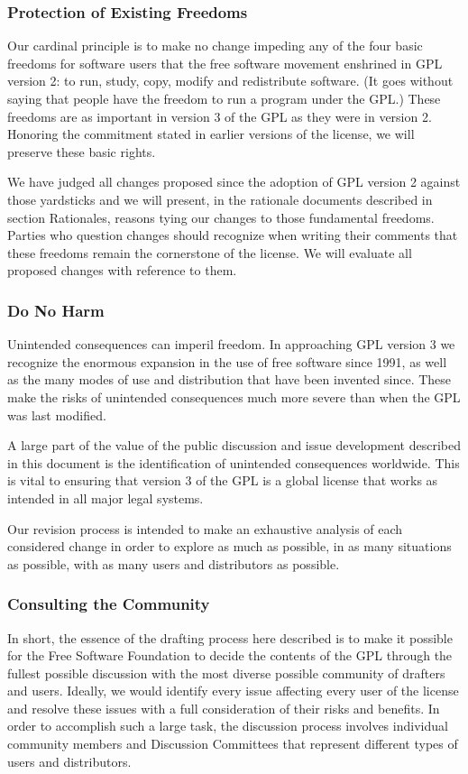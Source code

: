 \documentclass[a4paper,spanish,12pt]{book}
\begin{document}
\subsubsection{Protection of Existing Freedoms} Our cardinal principle is to
make no change impeding any of the four basic freedoms for software
users that the free software movement enshrined in GPL version 2: to
run, study, copy, modify and redistribute software.  (It goes without
saying that people have the freedom to run a program under the GPL\@.)
These freedoms are as important in version 3 of the GPL as they were
in version 2.  Honoring the commitment stated in earlier versions of
the license, we will preserve these basic rights.

We have judged all changes proposed since the adoption of GPL version
2 against those yardsticks and we will present, in the rationale
documents described in section Rationales, reasons tying our
changes to those fundamental freedoms.  Parties who question changes
should recognize when writing their comments that these freedoms
remain the cornerstone of the license.  We will evaluate all proposed
changes with reference to them.

\subsubsection{Do No Harm} Unintended consequences can imperil freedom.  In
approaching GPL version 3 we recognize the enormous expansion in the
use of free software since 1991, as well as the many modes of use and
distribution that have been invented since.  These make the risks of
unintended consequences much more severe than when the GPL was last
modified.

A large part of the value of the public discussion and issue
development described in this document is the identification of
unintended consequences worldwide.  This is vital to ensuring that
version 3 of the GPL is a global license that works as intended in all
major legal systems.

Our revision process is intended to make an exhaustive analysis of
each considered change in order to explore as much as possible, in as
many situations as possible, with as many users and distributors as
possible.

\subsubsection{Consulting the Community} In short, the essence of the
drafting process here described is to make it possible for the Free
Software Foundation to decide the contents of the GPL through the
fullest possible discussion with the most diverse possible community
of drafters and users.  Ideally, we would identify every issue
affecting every user of the license and resolve these issues with a
full consideration of their risks and benefits.  In order to
accomplish such a large task, the discussion process involves
individual community members and Discussion Committees that represent
different types of users and distributors.
\end{document}
